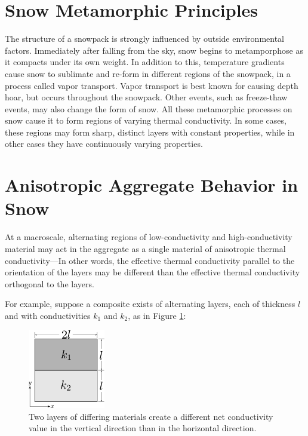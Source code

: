 \section{Snow Metamorphic Principles}
\label{sec:introduction:metamorphic}

The structure of a snowpack is strongly influenced by outside environmental
factors. Immediately after falling from the sky, snow begins to metamporphose as
it compacts under its own weight. In addition to this, temperature gradients
cause snow to sublimate and re-form in different regions of the snowpack, in a
process called vapor transport. Vapor transport is best known for causing
depth hoar, but occurs throughout the snowpack. Other events, such as
freeze-thaw events, may also change the form of snow. All these metamorphic
processes on snow cause it to form regions of varying thermal conductivity. In
some cases, these regions may form sharp, distinct layers with constant
properties, while in other cases they have continuously varying properties.

\section{Anisotropic Aggregate Behavior in Snow}

At a macroscale, alternating regions of low-conductivity and high-conductivity
material may act in the aggregate as a single material of anisotropic thermal
conductivity---In other words, the effective thermal conductivity parallel to
the orientation of the layers may be different than the effective thermal
conductivity orthogonal to the layers.

For example, suppose a composite exists of alternating layers, each of thickness
\(l\) and with conductivities \(k_1\) and \(k_2\), as in Figure
\ref{fig:ex_laminate}:

\begin{figure}[h]
\centering
\includegraphics[width=0.3\textwidth]{fig/ex_laminate.png}
\caption{Two layers of differing materials create a different net conductivity value in the vertical direction than in the horizontal direction.}
\label{fig:ex_laminate}
\end{figure}

